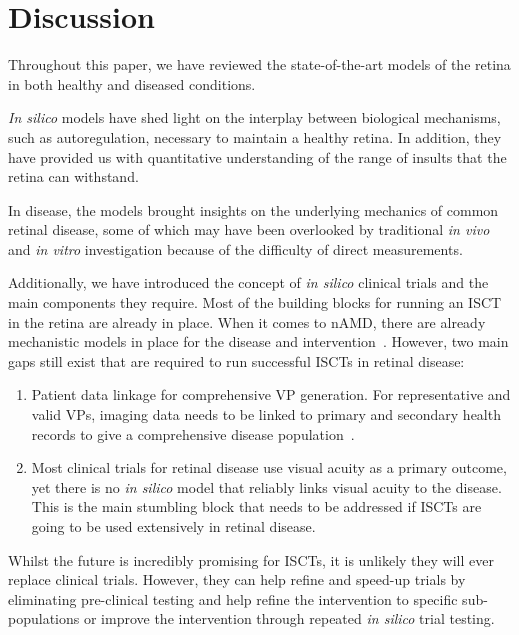 \documentclass{article}
\begin{document}
\section{Discussion}\label{sec:Conclusion}

Throughout this paper, we have reviewed the state-of-the-art models of the retina in both healthy and diseased conditions.

\textit{In silico} models have shed light on the interplay between biological mechanisms, such as autoregulation, necessary to maintain a healthy retina.
In addition, they have provided us with quantitative understanding of the range of insults that the retina can withstand.

In disease, the models brought insights on the underlying mechanics of common retinal disease, some of which may have been overlooked by traditional \textit{in vivo} and \textit{in vitro} investigation because of the difficulty of direct measurements.

Additionally, we have introduced the concept of \textit{in silico} clinical trials and the main components they require. 
Most of the building blocks for running an ISCT in the retina are already in place. When it comes to nAMD, there are already mechanistic models in place for the disease and intervention~\cite{Hoyle_2017, Vega2021}. However, two main gaps still exist that are required to run successful ISCTs in retinal disease: 

\begin{enumerate}
\item{Patient data linkage for comprehensive VP generation. For representative and valid VPs, imaging data needs to be linked to primary and secondary health records to give a comprehensive disease population~\cite{ElBouri2021}.}

\item{Most clinical trials for retinal disease use visual acuity as a primary outcome, yet there is no \textit{in silico} model that reliably links visual acuity to the disease. This is the main stumbling block that needs to be addressed if ISCTs are going to be used extensively in retinal disease.}
\end{enumerate}

Whilst the future is incredibly promising for ISCTs, it is unlikely they will ever replace clinical trials. However, they can help refine and speed-up trials by eliminating pre-clinical testing and help refine the intervention to specific sub-populations or improve the intervention through repeated \textit{in silico} trial testing.





\end{document}
